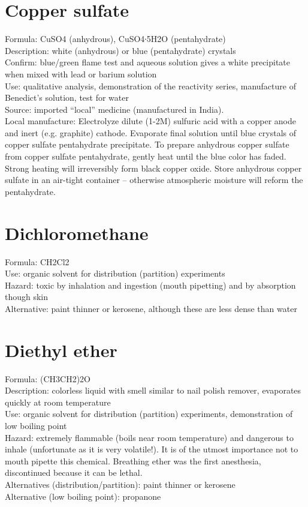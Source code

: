 \section{Copper sulfate}
Formula: CuSO4 (anhydrous), 
CuSO4∙5H2O (pentahydrate)\\
Description: white (anhydrous) or blue (pentahydrate) crystals\\
Confirm: blue/green flame test 
and aqueous solution gives a white precipitate 
when mixed with lead or barium solution\\
Use: qualitative analysis, 
demonstration of the reactivity series, 
manufacture of Benedict's solution, 
test for water\\
Source: imported “local” medicine (manufactured in India).\\ 
Local manufacture: Electrolyze dilute (1-2M) sulfuric acid 
with a copper anode and inert (e.g. 
graphite) cathode. 
Evaporate final solution until 
blue crystals of copper sulfate pentahydrate precipitate. 
To prepare anhydrous copper sulfate from copper sulfate pentahydrate, 
gently heat until the blue color has faded. 
Strong heating will irreversibly form black copper oxide. 
Store anhydrous copper sulfate in an air-tight container – 
otherwise atmospheric moisture will reform the pentahydrate.

\section{Dichloromethane}
Formula: CH2Cl2\\
Use: organic solvent for distribution (partition) experiments\\
Hazard: toxic by inhalation and ingestion (mouth pipetting) 
and by absorption though skin\\
Alternative: paint thinner or kerosene, 
although these are less dense than water

\section{Diethyl ether}
Formula: (CH3CH2)2O\\
Description: colorless liquid with smell similar to nail polish remover, 
evaporates quickly at room temperature\\
Use: organic solvent for distribution (partition) experiments, 
demonstration of low boiling point\\
Hazard: extremely flammable (boils near room temperature) 
and dangerous to inhale (unfortunate as it is very volatile!). 
It is of the utmost importance not to mouth pipette this chemical. 
Breathing ether was the first anesthesia, 
discontinued because it can be lethal.\\
Alternatives (distribution/partition): paint thinner or kerosene\\
Alternative (low boiling point): propanone

